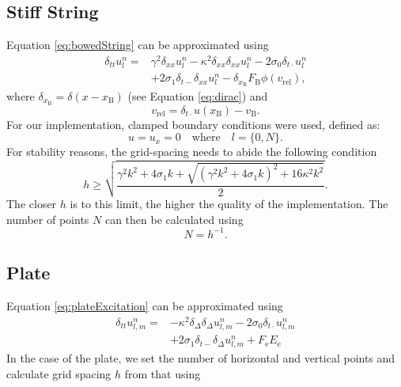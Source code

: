 \documentclass{article}
\begin{document}
\subsection{Stiff String}\label{subsec:stiffStringFDS}
Equation \eqref{eq:bowedString} can be approximated using
\begin{equation}
\begin{aligned}\label{eq:stiffStringFDS}
\delta_{tt} u_l^n =&\gamma^2 \delta_{xx} u_l^n -\kappa^2\delta_{xx}\delta_{xx} u_l^n - 2\sigma_0\delta_{t\cdot} u_l^n  \\
&+ 2\sigma_1\delta_{t-}\delta_{xx}u_l^n - \delta_{x_\text{B}}F_\text{B}\phi(v_\text{rel}),
\end{aligned}
\end{equation}
where $\delta_{x_\text{B}} = \delta(x-x_\text{B})$ (see Equation \eqref{eq:dirac}) and 
\begin{equation}\label{eq:descreteRelativeVel}
    v_\text{rel} = \delta_{t\cdot}u(x_\text{B})-v_\text{B}.
\end{equation}
For our implementation, clamped boundary conditions were used, defined as:
\begin{equation}\label{boundary}
    u = u_x = 0 \quad \text{where} \quad l = \{0, N\}.
  \end{equation}
For stability reasons, the grid-spacing needs to abide the following condition
\begin{equation}
    h \geq \sqrt{\frac{\gamma^2 k^2 + 4 \sigma_1 k + \sqrt {(\gamma^2 k^2 + 4 \sigma_1 k)^2 + 16 \kappa^2 k^2}}{2}}.
\end{equation}
The closer $h$ is to this limit, the higher the quality of the implementation. The number of points $N$ can then be calculated using 
\begin{equation}
    N = h^{-1}.
\end{equation}


\subsection{Plate}
  

Equation \eqref{eq:plateExcitation} can be approximated using
\begin{equation}
    \begin{aligned}\label{eq:plateFDS}
        \delta_{tt}u_{l,m}^n = &-\kappa^2 \delta_\Delta\delta_\Delta u_{l,m}^n - 2\sigma_0\delta_{t\cdot}u_{l,m}^n \\
        &+ 2\sigma_1\delta_{t−}\delta_\Delta u_{l,m}^n + F_\text{e}E_\text{e}
    \end{aligned}
\end{equation}
In the case of the plate, we set the number of horizontal and vertical points and calculate grid spacing $h$ from that using 
\end{document}
